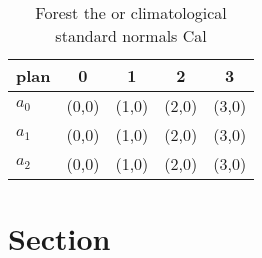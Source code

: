\documentclass[a4paper]{article}
\begin{document}
\begin{table}
\begin{adjustbox}{width=0.6\columnwidth}
\begin{tabular}{|l|l|l|l|l|}
\hline
\textbf{plan} & \multicolumn{1}{c|}{\textbf{0}} & \multicolumn{1}{c|}{\textbf{1}} & \multicolumn{1}{c|}{\textbf{2}} & \multicolumn{1}{c|}{\textbf{3}} \\ \hline
\textbf{$a_0$}  & (0,0) & (1,0) & (2,0) & (3,0) \\ \hline
\textbf{$a_1$}  & (0,0) & (1,0) & (2,0) & (3,0) \\ \hline
\textbf{$a_2$}  & (0,0) & (1,0) & (2,0) & (3,0) \\ \hline
\end{tabular}
\end{adjustbox}
\caption{Forest the or climatological standard normals Cal
}
\end{table}

\section{Section}
\end{document}
